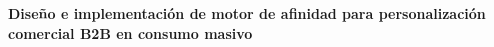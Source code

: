 \begin{titlepage}

    \begin{flushright}
        \setlength{\rightskip}{-2cm} %
        \vspace*{7cm} %

        {\bfseries\fontsize{33pt}{40pt}\selectfont
        Diseño e implementación de motor de afinidad para personalización comercial B2B en consumo masivo} \\[1.5cm]


\end{flushright}
\end{titlepage}
